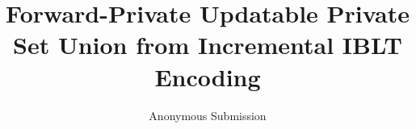 \documentclass[letterpaper,twocolumn,10pt]{article}
\theoremstyle{definition}
\begin{document}
\title{Forward-Private Updatable Private Set Union from Incremental IBLT Encoding}
\author{Anonymous Submission}
\maketitle







\end{document}
